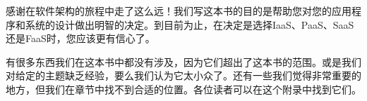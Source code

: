 感谢在软件架构的旅程中走了这么远！我们写这本书的目的是帮助您对您的应用程序和系统的设计做出明智的决定。到目前为止，在决定是选择IaaS、PaaS、SaaS还是FaaS时，您应该更有信心了。

有很多东西我们在这本书中都没有涉及，因为它们超出了这本书的范围。或是我们对给定的主题缺乏经验，要么我们认为它太小众了。还有一些我们觉得非常重要的地方，但我们在章节中找不到合适的位置。各位读者可以在这个附录中找到它们。